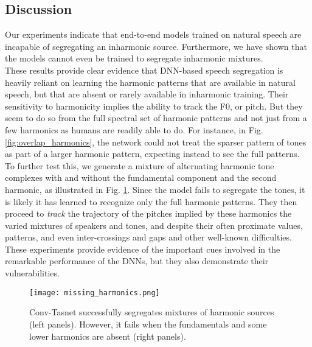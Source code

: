 \documentclass{article}
\begin{document}
\vspace*{-1mm}

\subsection{Discussion} \label{Discussion}
Our experiments indicate that end-to-end models trained on natural speech are incapable of segregating an inharmonic source. Furthermore, we have shown that the models cannot even be trained to segregate inharmonic mixtures.\\ These results provide clear evidence that DNN-based speech segregation is heavily reliant on learning the harmonic patterns that are available in natural speech, but that are absent or rarely available in inharmonic training. Their sensitivity to harmonicity implies the ability to track the F0, or pitch. But they seem to do so from the full spectral set of harmonic patterns and not just from a few harmonics as humans are readily able to do. For instance, in Fig.\ref{fig:overlap_harmonics}, the network could not treat the sparser pattern of tones as part of a larger harmonic pattern, expecting instead to see the full patterns. 
To further test this, we generate a mixture of alternating harmonic tone complexes with and without the fundamental component and the second harmonic, as illustrated in Fig. \ref{fig:missing_harmonics}. Since the model fails to segregate the tones, it is likely it has learned to recognize only the full harmonic patterns. They then proceed to \textit{track} the trajectory of the pitches implied by these harmonics the varied mixtures of speakers and tones, and despite their often proximate values, patterns, and even inter-crossings and gaps and other well-known difficulties. These experiments provide evidence of the important cues involved in the remarkable performance of the DNNs, but they also demonstrate their vulnerabilities. \\

\vspace*{-5mm}
\begin{figure}[!htp]
  \vspace*{-2mm}
  \centering
  \texttt{[image: missing\_harmonics.png]}
  \caption{Conv-Tasnet successfully segregates mixtures of harmonic sources (left panels). However, it fails when the fundamentals and some lower harmonics are absent (right panels).}
  \label{fig:missing_harmonics}
  \vspace*{-7mm}
\end{figure}
\end{document}

